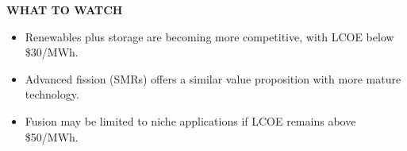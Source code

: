\documentclass[10pt,a4paper]{article}
\begin{document}
\vspace{4pt}\noindent\begin{minipage}{\linewidth}
{\textcolor{BOGreen}{\scriptsize\bfseries WHAT TO WATCH}}\par\vspace{2pt}
{\footnotesize\begin{itemize}
\item Renewables plus storage are becoming more competitive, with LCOE below \$30/MWh.
\item Advanced fission (SMRs) offers a similar value proposition with more mature technology.
\item Fusion may be limited to niche applications if LCOE remains above \$50/MWh.
\end{itemize}}
\end{minipage}
\label{chap:7:end}
\end{document}
